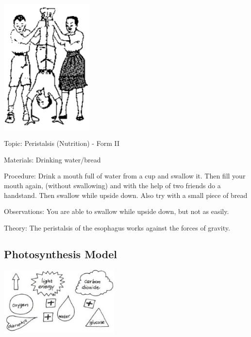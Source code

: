 \begin{multicols}{2}
\begin{center}
\includegraphics[width=0.35\textwidth]{./img/source/peristalsis.png}
\end{center}

\begin{description*}
\item[Topic:]{Peristalsis (Nutrition) - Form II}
\item[Materials:]{Drinking water/bread}
\item[Procedure:]{Drink a mouth full of water from a cup and swallow it. Then fill your mouth again, (without
swallowing) and with the help of two friends do a handstand. Then swallow while upside down. Also try with a small piece of bread}
\item[Observations:]{You are able to swallow while upside down, but not as easily.}
\item[Theory:]{The peristalsis of the
esophagus works against the forces of gravity.}
\end{description*}

\subsection{Photosynthesis Model} %

\begin{center}
\includegraphics[width=0.45\textwidth]{./img/vso/photo-model.jpg}
\end{center}


\end{multicols}
